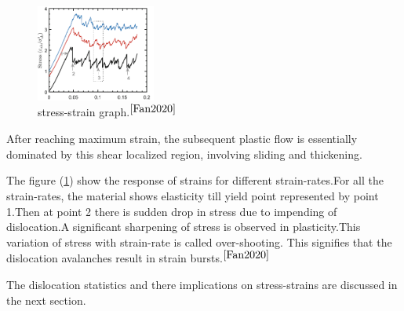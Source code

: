 \begin{figure}
\centering
\includegraphics[width=0.35\textwidth]{section_3_1.png}
\caption{\label{fig:Simulation graph}stress-strain graph.$^{\cite{Fan2020}}$}
\end{figure}


After reaching maximum strain, the subsequent
plastic flow is essentially dominated by this shear localized region, involving sliding
and thickening. 

The figure (\ref{fig:Simulation graph}) show the response of strains for different strain-rates.For all the strain-rates, the material shows elasticity till yield point represented by point 1.Then at point 2 there is sudden drop in stress due to impending of dislocation.A significant sharpening of stress is observed in plasticity.This variation of stress with strain-rate is called over-shooting. This signifies that the dislocation avalanches result in strain bursts.$^{\cite{Fan2020}}$

The dislocation statistics and there implications on stress-strains are discussed in the next section.